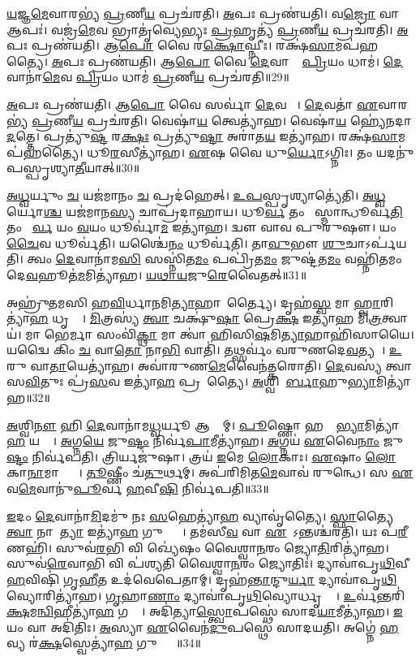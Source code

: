 \ul{𑌯}𑌜𑍍𑌞\ul{𑌮𑍇}𑌵𑌾𑌰𑌭𑍍𑌯॑ \ul{𑌪𑍍𑌰}𑌣𑍀\ul{𑌯} 𑌪𑍍𑌰𑌚॑𑌰𑌤𑌿।
\ul{𑌅}𑌪𑌃 𑌪𑍍𑌰𑌣॑𑌯𑌤𑌿।
𑌵\ul{𑌜𑍍𑌰𑍋} 𑌵𑌾 𑌆𑌪𑌃॑।
𑌵𑌜𑍍𑌰॑\ul{𑌮𑍇}𑌵 𑌭𑍍𑌰𑌾𑌤𑍃॑𑌵𑍍𑌯𑍇𑌭𑍍𑌯𑌃 \ul{𑌪𑍍𑌰}𑌹𑍃𑌤𑍍𑌯॑ \ul{𑌪𑍍𑌰}𑌣𑍀\ul{𑌯} 𑌪𑍍𑌰𑌚॑𑌰𑌤𑌿।
\ul{𑌅}𑌪𑌃 𑌪𑍍𑌰𑌣॑𑌯𑌤𑌿।
𑌆\ul{𑌪𑍋} 𑌵𑍈 𑌰॑\ul{𑌕𑍍𑌷𑍋}𑌘𑍍𑌨𑍀𑌃।
𑌰𑌕𑍍𑌷॑\ul{𑌸𑌾}𑌮𑌪॑𑌹𑌤𑍍𑌯𑍈।
\ul{𑌅}𑌪𑌃 𑌪𑍍𑌰𑌣॑𑌯𑌤𑌿।
𑌆\ul{𑌪𑍋} 𑌵𑍈 \ul{𑌦𑍇}𑌵𑌾𑌨𑌾𑌂᳚ \ul{𑌪𑍍𑌰𑌿}𑌯𑌂 𑌧𑌾𑌮॑।
\ul{𑌦𑍇}𑌵𑌾𑌨𑌾॑\ul{𑌮𑍇}𑌵 \ul{𑌪𑍍𑌰𑌿}𑌯𑌂 𑌧𑌾𑌮॑ \ul{𑌪𑍍𑌰}𑌣𑍀\ul{𑌯} 𑌪𑍍𑌰𑌚॑𑌰𑌤𑌿॥29॥

\ul{𑌅}𑌪𑌃 𑌪𑍍𑌰𑌣॑𑌯𑌤𑌿।
𑌆\ul{𑌪𑍋} 𑌵𑍈 𑌸𑌰𑍍𑌵𑌾॑ \ul{𑌦𑍇}𑌵𑌤𑌾𑌃᳚।
\ul{𑌦𑍇}𑌵𑌤𑌾॑ \ul{𑌏}𑌵𑌾𑌰𑌭𑍍𑌯॑ \ul{𑌪𑍍𑌰}𑌣𑍀\ul{𑌯} 𑌪𑍍𑌰𑌚॑𑌰𑌤𑌿।
𑌵𑍇𑌷𑌾॑\ul{𑌯} 𑌤𑍍𑌵𑍇𑌤𑍍𑌯𑌾॑𑌹।
𑌵𑍇𑌷𑌾॑\ul{𑌯} 𑌹𑍍𑌯𑍇॑𑌨𑌦𑌾\ul{𑌦}𑌤𑍍𑌤𑍇।
𑌪𑍍𑌰𑌤𑍍𑌯𑍁॑\ul{𑌷𑍍𑌟}\ul{} 𑌰\ul{𑌕𑍍𑌷𑌃} 𑌪𑍍𑌰𑌤𑍍𑌯𑍁॑\ul{𑌷𑍍𑌟𑌾} 𑌅𑌰𑌾॑𑌤\ul{𑌯} 𑌇𑌤𑍍𑌯𑌾॑𑌹।
𑌰𑌕𑍍𑌷॑\ul{𑌸𑌾}𑌮𑌪॑𑌹𑌤𑍍𑌯𑍈।
𑌧𑍂\ul{𑌰}𑌸𑍀𑌤𑍍𑌯𑌾॑𑌹।
\ul{𑌏}𑌷 𑌵𑍈 𑌧𑍁\ul{𑌰𑍍𑌯𑍋}\-𑌽𑌗𑍍𑌨𑌿𑌃।
𑌤𑌂 𑌯𑌦𑌨𑍁॑𑌪𑌸𑍍𑌪𑍃𑌶𑍍𑌯𑌾\ul{𑌤𑍀}𑌯𑌾𑌤𑍍॥30॥

\ul{𑌅}\ul{𑌧𑍍𑌵}𑌰𑍍𑌯𑍁𑌂 \ul{𑌚} 𑌯𑌜॑𑌮𑌾𑌨𑌂 \ul{𑌚} 𑌪𑍍𑌰𑌦॑𑌹𑍇𑌤𑍍।
\ul{𑌉}\ul{𑌪}𑌸𑍍𑌪𑍃𑌶𑍍𑌯𑌾𑌤𑍍𑌯𑍇॑𑌤𑌿।
\ul{𑌅}\ul{𑌧𑍍𑌵}𑌰𑍍𑌯𑍋\ul{𑌶𑍍𑌚} 𑌯𑌜॑𑌮𑌾𑌨\ul{𑌸𑍍𑌯} 𑌚𑌾𑌪𑍍𑌰॑𑌦𑌾𑌹𑌾𑌯।
𑌧𑍂\ul{𑌰𑍍𑌵} 𑌤𑌂 𑌯𑍋᳚𑌸𑍍𑌮𑌾𑌨𑍍𑌧𑍂𑌰𑍍𑌵॑\ul{𑌤𑌿} 𑌤𑌂 𑌧𑍂᳚\ul{𑌰𑍍𑌵} 𑌯𑌂 \ul{𑌵}𑌯𑌂 𑌧𑍂𑌰𑍍𑌵𑌾॑\ul{𑌮} 𑌇𑌤𑍍𑌯𑌾॑𑌹।
𑌦𑍍𑌵𑍗 𑌵𑌾𑌵 𑌪𑍁𑌰𑍁॑𑌷𑍗।
𑌯𑌂 \ul{𑌚𑍈}𑌵 𑌧𑍂𑌰𑍍𑌵॑𑌤𑌿।
𑌯𑌶𑍍𑌚𑍈॑\ul{𑌨𑌂} 𑌧𑍂𑌰𑍍𑌵॑𑌤𑌿।
𑌤𑌾\ul{𑌵𑍁}𑌭𑍗 \ul{𑌶𑍁}𑌚𑌾\-𑌽𑌰𑍍𑌪॑𑌯𑌤𑌿।
𑌤𑍍𑌵𑌂 \ul{𑌦𑍇}𑌵𑌾𑌨𑌾॑𑌮\ul{𑌸𑌿} 𑌸𑌸𑍍𑌨𑌿॑𑌤\ul{𑌮𑌂} 𑌪𑌪𑍍𑌰𑌿॑𑌤\ul{𑌮𑌂} 𑌜𑍁𑌷𑍍𑌟॑𑌤\ul{𑌮𑌂} 𑌵𑌹𑍍𑌨𑌿॑𑌤𑌮𑌂 𑌦𑍇\ul{𑌵}𑌹𑍂𑌤॑\ul{𑌮}𑌮𑌿𑌤𑍍𑌯𑌾॑𑌹।
\ul{𑌯}\ul{𑌥𑌾}\ul{𑌯}𑌜𑍁\ul{𑌰𑍇}𑌵𑍈𑌤𑌤𑍍॥31॥

𑌅𑌹𑍍𑌰𑍁॑𑌤𑌮𑌸𑌿 𑌹\ul{𑌵𑌿}𑌰𑍍𑌧𑌾\ul{𑌨}𑌮𑌿\ul{𑌤𑍍𑌯𑌾}𑌹𑌾𑌨𑌾᳚𑌰𑍍𑌤𑍍𑌯𑍈।
𑌦𑍃𑌹॑\ul{𑌸𑍍𑌵} 𑌮𑌾 \ul{𑌹𑍍𑌵𑌾}𑌰𑌿𑌤𑍍𑌯𑌾॑\ul{𑌹} 𑌧𑍃𑌤𑍍𑌯𑍈᳚।
\ul{𑌮𑌿}𑌤𑍍𑌰𑌸𑍍𑌯॑ \ul{𑌤𑍍𑌵𑌾} 𑌚𑌕𑍍𑌷𑍁॑\ul{𑌷𑌾} 𑌪𑍍𑌰𑍇\ul{𑌕𑍍𑌷} 𑌇𑌤𑍍𑌯𑌾॑𑌹 𑌮𑌿\ul{𑌤𑍍𑌰}𑌤𑍍𑌵𑌾𑌯॑।
𑌮𑌾 𑌭𑍇𑌰𑍍𑌮𑌾 𑌸𑌂𑌵𑌿॑\ul{𑌕𑍍𑌥𑌾} 𑌮𑌾 𑌤𑍍𑌵𑌾॑ 𑌹𑌿𑌸𑌿\ul{𑌷}𑌮𑌿\ul{𑌤𑍍𑌯𑌾}𑌹𑌾𑌹𑌿॑𑌸𑌾𑌯𑍈।
𑌯𑌦𑍍𑌵𑍈 𑌕𑌿𑌂 \ul{𑌚} 𑌵𑌾\ul{𑌤𑍋} 𑌨𑌾\ul{𑌭𑌿} 𑌵𑌾𑌤𑌿॑।
𑌤𑌥𑍍𑌸𑌰𑍍𑌵𑌂॑ 𑌵𑌰𑍁𑌣𑌦𑍇\ul{𑌵}𑌤𑍍𑌯𑌮𑍍᳚।
\ul{𑌉}𑌰𑍁 𑌵𑌾\ul{𑌤𑌾}𑌯𑍇𑌤𑍍𑌯𑌾॑𑌹।
𑌅𑌵𑌾॑𑌰𑍁𑌣\ul{𑌮𑍇}𑌵𑍈𑌨॑𑌤𑍍𑌕𑌰𑍋𑌤𑌿।
\ul{𑌦𑍇}𑌵𑌸𑍍𑌯॑ 𑌤𑍍𑌵𑌾 𑌸\ul{𑌵𑌿}𑌤𑍁𑌃 𑌪𑍍𑌰॑\ul{𑌸}𑌵 𑌇𑌤𑍍𑌯𑌾॑\ul{𑌹} 𑌪𑍍𑌰𑌸𑍂᳚𑌤𑍍𑌯𑍈।
\ul{𑌅}𑌶𑍍𑌵𑌿𑌨𑍋᳚\ul{𑌰𑍍𑌬𑌾}𑌹𑍁\ul{𑌭𑍍𑌯𑌾}𑌮𑌿𑌤𑍍𑌯𑌾॑𑌹॥32॥

\ul{𑌅}𑌶𑍍𑌵𑌿\ul{𑌨𑍗} 𑌹𑌿 \ul{𑌦𑍇}𑌵𑌾𑌨𑌾॑𑌮\ul{𑌧𑍍𑌵}𑌰𑍍𑌯𑍂 𑌆𑌸𑍍𑌤𑌾᳚𑌮𑍍।
\ul{𑌪𑍂}𑌷𑍍𑌣𑍋 𑌹𑌸𑍍𑌤𑌾᳚\ul{𑌭𑍍𑌯𑌾}𑌮𑌿𑌤𑍍𑌯𑌾॑\ul{𑌹} 𑌯𑌤𑍍𑌯𑍈᳚।
\ul{𑌅}𑌗𑍍𑌨\ul{𑌯𑍇} 𑌜𑍁\ul{𑌷𑍍𑌟𑌂} 𑌨𑌿𑌰𑍍𑌵॑\ul{𑌪𑌾}𑌮𑍀𑌤𑍍𑌯𑌾॑𑌹।
\ul{𑌅}𑌗𑍍𑌨𑌯॑ \ul{𑌏}𑌵𑍈\ul{𑌨𑌾𑌂} 𑌜𑍁\ul{𑌷𑍍𑌟𑌂} 𑌨𑌿𑌰𑍍𑌵॑𑌪𑌤𑌿।
𑌤𑍍𑌰𑌿𑌰𑍍𑌯𑌜𑍁॑𑌷𑌾।
𑌤𑍍𑌰𑌯॑ \ul{𑌇}𑌮𑍇 \ul{𑌲𑍋}𑌕𑌾𑌃।
\ul{𑌏}𑌷𑌾𑌂 \ul{𑌲𑍋}𑌕𑌾\ul{𑌨𑌾}𑌮𑌾𑌪𑍍𑌤𑍍𑌯𑍈᳚।
\ul{𑌤𑍂}𑌷𑍍𑌣𑍀𑌂 𑌚॑\ul{𑌤𑍁}𑌰𑍍𑌥𑌮𑍍।
𑌅𑌪॑𑌰𑌿𑌮𑌿𑌤\ul{𑌮𑍇}𑌵𑌾𑌵॑ 𑌰𑍁𑌨𑍍𑌧𑍇।
𑌸 \ul{𑌏}𑌵\ul{𑌮𑍇}𑌵𑌾𑌨𑍁॑\ul{𑌪𑍂}𑌰𑍍𑌵 \ul{𑌹}𑌵𑍀\ul{𑌷𑌿} 𑌨𑌿𑌰𑍍𑌵॑𑌪𑌤𑌿॥33॥

\ul{𑌇}𑌦𑌂 \ul{𑌦𑍇}𑌵𑌾𑌨𑌾॑\ul{𑌮𑌿}𑌦𑌮𑍁॑ 𑌨𑌃 \ul{𑌸}𑌹𑍇𑌤𑍍𑌯𑌾॑\ul{𑌹} 𑌵𑍍𑌯𑌾𑌵𑍃॑𑌤𑍍𑌯𑍈।
\ul{𑌸𑍍𑌫𑌾}𑌤𑍍𑌯𑍈 \ul{𑌤𑍍𑌵𑌾} 𑌨𑌾𑌰𑌾᳚\ul{𑌤𑍍𑌯𑌾} 𑌇𑌤𑍍𑌯𑌾॑\ul{𑌹} 𑌗𑍁𑌪𑍍𑌤𑍍𑌯𑍈᳚।
𑌤𑌮॑𑌸𑍀\ul{𑌵} 𑌵𑌾 \ul{𑌏}𑌷𑍋᳚\-𑌽𑌨𑍍𑌤𑌶𑍍𑌚॑𑌰𑌤𑌿।
𑌯𑌃 𑌪॑\ul{𑌰𑍀}𑌣𑌹𑌿॑।
𑌸𑍁𑌵॑\ul{𑌰}𑌭𑌿 𑌵𑌿 𑌖𑍍𑌯𑍇॑𑌷𑌂 𑌵𑍈𑌶𑍍𑌵𑌾\ul{𑌨}𑌰𑌂 𑌜𑍍𑌯𑍋\ul{𑌤𑌿}𑌰𑌿𑌤𑍍𑌯𑌾॑𑌹।
𑌸𑍁𑌵॑\ul{𑌰𑍇}𑌵𑌾𑌭𑌿 𑌵𑌿 𑌪॑𑌶𑍍𑌯𑌤𑌿 𑌵𑍈𑌶𑍍𑌵𑌾\ul{𑌨}𑌰𑌂 𑌜𑍍𑌯𑍋𑌤𑌿𑌃॑।
𑌦𑍍𑌯𑌾𑌵𑌾॑𑌪𑍃\ul{𑌥𑌿}𑌵𑍀 \ul{𑌹}𑌵𑌿𑌷𑌿॑ 𑌗𑍃\ul{𑌹𑍀}𑌤 𑌉𑌦॑𑌵𑍇𑌪𑍇𑌤𑌾𑌮𑍍।
𑌦𑍃𑌹॑\ul{𑌨𑍍𑌤𑌾}𑌨𑍍𑌦𑍁\ul{𑌰𑍍𑌯𑌾} 𑌦𑍍𑌯𑌾𑌵𑌾॑𑌪𑍃\ul{𑌥𑌿}𑌵𑍍𑌯𑍋𑌰𑌿𑌤𑍍𑌯𑌾॑𑌹।
\ul{𑌗𑍃}𑌹𑌾\ul{𑌣𑌾𑌂} 𑌦𑍍𑌯𑌾𑌵𑌾॑𑌪𑍃\ul{𑌥𑌿}𑌵𑍍𑌯𑍋𑌰𑍍𑌧𑍃𑌤𑍍𑌯𑍈᳚।
\ul{𑌉}𑌰𑍍𑌵॑𑌨𑍍𑌤𑌰𑌿॑\ul{𑌕𑍍𑌷}𑌮\ul{𑌨𑍍𑌵𑌿}𑌹𑍀𑌤𑍍𑌯𑌾॑\ul{𑌹} 𑌗𑌤𑍍𑌯𑍈᳚।
𑌅𑌦𑌿॑𑌤𑍍𑌯𑌾\ul{𑌸𑍍𑌤𑍍𑌵𑍋}𑌪𑌸𑍍𑌥𑍇॑ 𑌸𑌾𑌦\ul{𑌯𑌾}𑌮𑍀𑌤𑍍𑌯𑌾॑𑌹।
\ul{𑌇}𑌯𑌂 𑌵𑌾 𑌅𑌦𑌿॑𑌤𑌿𑌃।
\ul{𑌅}𑌸𑍍𑌯𑌾 \ul{𑌏}𑌵𑍈𑌨॑\ul{𑌦𑍁}𑌪𑌸𑍍𑌥𑍇॑ 𑌸𑌾𑌦𑌯𑌤𑌿।
𑌅𑌗𑍍𑌨𑍇॑ \ul{𑌹}𑌵𑍍𑌯 𑌰॑\ul{𑌕𑍍𑌷}𑌸𑍍𑌵𑍇𑌤𑍍𑌯𑌾॑\ul{𑌹} 𑌗𑍁𑌪𑍍𑌤𑍍𑌯𑍈᳚॥34॥\anuvakamend[\ul{𑌯}𑌜𑍍𑌞𑍋 𑌵𑌾 𑌆\ul{𑌪𑍋} 𑌧𑌾𑌮॑ \ul{𑌪𑍍𑌰}𑌣𑍀\ul{𑌯} 𑌪𑍍𑌰𑌚॑𑌰𑌤𑍍𑌯\ul{𑌤𑍀}𑌯𑌾\ul{𑌦𑍇}𑌤\ul{𑌦𑍍𑌬𑌾}𑌹𑍁\ul{𑌭𑍍𑌯𑌾}𑌮𑌿𑌤𑍍𑌯𑌾॑𑌹 \ul{𑌹}𑌵𑍀\dng{ꣳ}\ul{𑌷𑌿} 𑌨𑌿𑌰𑍍𑌵॑𑌪\ul{𑌤𑌿} 𑌗𑌤𑍍𑌯𑍈॑ \ul{𑌚}𑌤𑍍𑌵𑌾𑌰𑌿॑ 𑌚]

